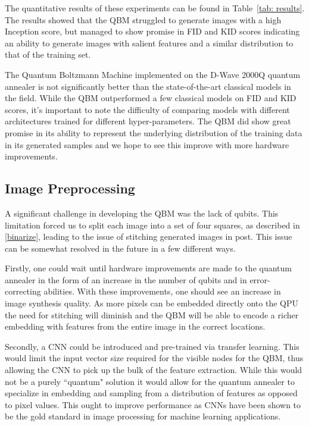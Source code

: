 \documentclass[%
 reprint,
 amsmath,amssymb,
 aps,
]{revtex4-2}
\begin{document}
The quantitative results of these experiments can be found in Table~\ref{tab: results}. The results showed that the QBM struggled to generate images with a high Inception score, but managed to show promise in FID and KID scores indicating an ability to generate images with salient features and a similar distribution to that of the training set.


The Quantum Boltzmann Machine implemented on the D-Wave 2000Q quantum annealer is not significantly better than the state-of-the-art classical models in the field. While the QBM outperformed a few classical models on FID and KID scores, it's important to note the difficulty of comparing models with different architectures trained for different hyper-parameters. The QBM did show great promise in its ability to represent the underlying distribution of the training data in its generated samples and we hope to see this improve with more hardware improvements.

\subsection{Image Preprocessing}
A significant challenge in developing the QBM was the lack of qubits. This limitation forced us to split each image into a set of four squares, as described in \ref{binarize}, leading to the issue of stitching generated images in post. This issue can be somewhat resolved in the future in a few different ways.


Firstly, one could wait until hardware improvements are made to the quantum annealer in the form of an increase in the number of qubits and in error-correcting abilities. With these improvements, one should see an increase in image synthesis quality. As more pixels can be embedded directly onto the QPU the need for stitching will diminish and the QBM will be able to encode a richer embedding with features from the entire image in the correct locations.


Secondly, a CNN could be introduced and pre-trained via transfer learning. This would limit the input vector size required for the visible nodes for the QBM, thus allowing the CNN to pick up the bulk of the feature extraction. While this would not be a purely ``quantum" solution it would allow for the quantum annealer to specialize in embedding and sampling from a distribution of features as opposed to pixel values. This ought to improve performance as CNNs have been shown to be the gold standard in image processing for machine learning applications.
\end{document}
